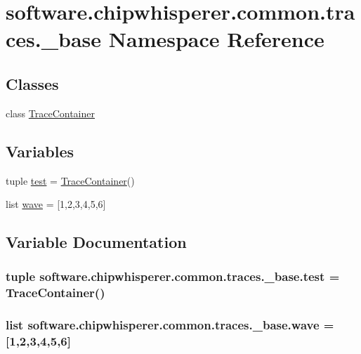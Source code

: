 \hypertarget{namespacesoftware_1_1chipwhisperer_1_1common_1_1traces_1_1__base}{}\section{software.\+chipwhisperer.\+common.\+traces.\+\_\+base Namespace Reference}
\label{namespacesoftware_1_1chipwhisperer_1_1common_1_1traces_1_1__base}
\subsection*{Classes}
\begin{DoxyCompactItemize}
\item 
class \hyperlink{classsoftware_1_1chipwhisperer_1_1common_1_1traces_1_1__base_1_1TraceContainer}{Trace\+Container}
\end{DoxyCompactItemize}
\subsection*{Variables}
\begin{DoxyCompactItemize}
\item 
tuple \hyperlink{namespacesoftware_1_1chipwhisperer_1_1common_1_1traces_1_1__base_a89e7eef7bf643f3eca462b291f832f74}{test} = \hyperlink{classsoftware_1_1chipwhisperer_1_1common_1_1traces_1_1__base_1_1TraceContainer}{Trace\+Container}()
\item 
list \hyperlink{namespacesoftware_1_1chipwhisperer_1_1common_1_1traces_1_1__base_a7575f757e8229f3e44f788b3da309173}{wave} = \mbox{[}1,2,3,4,5,6\mbox{]}
\end{DoxyCompactItemize}


\subsection{Variable Documentation}
\hypertarget{namespacesoftware_1_1chipwhisperer_1_1common_1_1traces_1_1__base_a89e7eef7bf643f3eca462b291f832f74}{}
\subsubsection[{test}]{\setlength{\rightskip}{0pt plus 5cm}tuple software.\+chipwhisperer.\+common.\+traces.\+\_\+base.\+test = {\bf Trace\+Container}()}\label{namespacesoftware_1_1chipwhisperer_1_1common_1_1traces_1_1__base_a89e7eef7bf643f3eca462b291f832f74}
\hypertarget{namespacesoftware_1_1chipwhisperer_1_1common_1_1traces_1_1__base_a7575f757e8229f3e44f788b3da309173}{}
\subsubsection[{wave}]{\setlength{\rightskip}{0pt plus 5cm}list software.\+chipwhisperer.\+common.\+traces.\+\_\+base.\+wave = \mbox{[}1,2,3,4,5,6\mbox{]}}\label{namespacesoftware_1_1chipwhisperer_1_1common_1_1traces_1_1__base_a7575f757e8229f3e44f788b3da309173}
